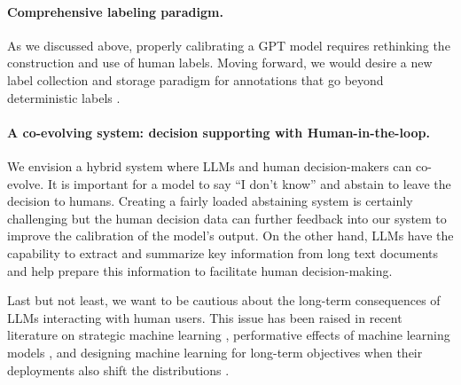 \documentclass{article}
\begin{document}
\paragraph{Comprehensive labeling paradigm.} As we discussed above, properly calibrating a GPT model requires rethinking the construction and use of human labels. Moving forward, we would desire a new label collection and storage paradigm for annotations that go beyond deterministic labels \cite{wei2022aggregate}. 


\paragraph{A co-evolving system: decision supporting with Human-in-the-loop.
}

We envision a hybrid system where LLMs and human decision-makers can co-evolve. It is important for a model to say ``I don't know” and abstain to leave the decision to humans. Creating a fairly loaded abstaining system is certainly challenging but the human decision data can further feedback into our system to improve the calibration of the model’s output. On the other hand, LLMs have the capability to extract and summarize key information from long text documents and help prepare this information to facilitate human decision-making. 

Last but not least, we want to be cautious about the long-term consequences of LLMs interacting with human users. This issue has been raised in recent literature on strategic machine learning \cite{hardt2016strategic,chen2020learning}, performative effects of machine learning models \cite{perdomo2020performative,liu2021model,estornell2021unfairness}, and designing machine learning for long-term objectives when their deployments also shift the distributions \cite{raab2021unintended,zhang2020fair,yin2023long}. 



\end{document}
